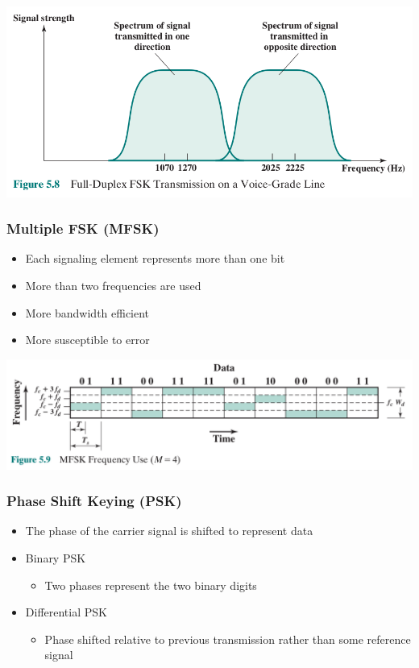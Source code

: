 \documentclass[pdflatex,compress]{beamer}
\begin{document}
\begin{frame}
	\begin{center}
		\includegraphics[width=\linewidth]{img/img12}
	\end{center}
\end{frame}

\begin{frame}
	\frametitle{Multiple FSK (MFSK)}
	\begin{itemize}
		\item Each signaling element represents more than one bit
		\item More than two frequencies are used
		\item More bandwidth efficient
		\item More susceptible to error
	\end{itemize}
\end{frame}

\begin{frame}
	\begin{center}
		\includegraphics[width=\linewidth]{img/img13}
	\end{center}
\end{frame}

\begin{frame}
	\frametitle{Phase Shift Keying (PSK)}
	\begin{itemize}
		\item The phase of the carrier signal is shifted to represent data
		\item Binary PSK
		\begin{itemize}
			\item Two phases represent the two binary digits
		\end{itemize}
		\item Differential PSK
		\begin{itemize}
			\item Phase shifted relative to previous transmission rather than some reference signal
		\end{itemize}
	\end{itemize}
\end{frame}
\end{document}
